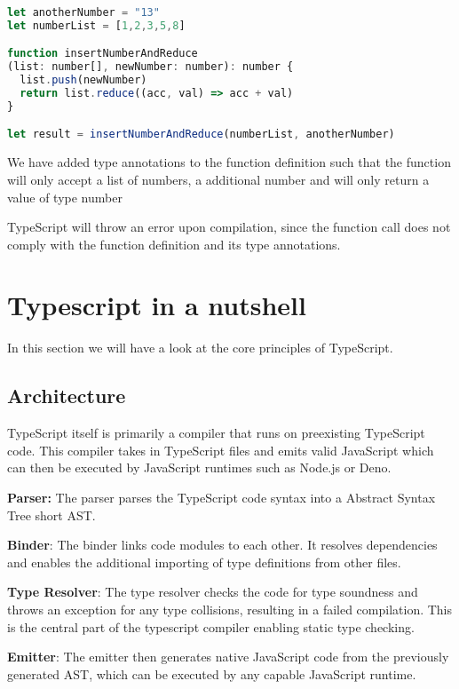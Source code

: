\documentclass[letterpaper,runningheads]{llncs}
\begin{document}
\begin{lstlisting}[style=ES6, language=JavaScript, caption="Fixed TypeScript code snippet"]
let anotherNumber = "13"
let numberList = [1,2,3,5,8]

function insertNumberAndReduce
(list: number[], newNumber: number): number {
  list.push(newNumber)
  return list.reduce((acc, val) => acc + val)
}

let result = insertNumberAndReduce(numberList, anotherNumber)
\end{lstlisting}

\begin{note}
We have added type annotations to the function definition such that
the function will only accept a list of numbers, a additional number
and will only return a value of type number
\end{note}

\begin{problem}
TypeScript will throw an error upon compilation, since the function
call does not comply with the function definition and its
type annotations. 
\end{problem}


\section{Typescript in a nutshell}

In this section we will have a look at the core principles of TypeScript.

\subsection{Architecture}

TypeScript itself is primarily a compiler that runs on preexisting TypeScript code. This compiler takes in TypeScript files and emits valid JavaScript which can then be executed by JavaScript runtimes such as Node.js or Deno.


\begin{list}{•}{The four building blocks of the TypeScript compiler:}

\item \textbf{Parser:} The parser parses the TypeScript code syntax into a Abstract Syntax Tree short AST.
\item \textbf{Binder}: The binder links code modules to each other. It resolves dependencies and enables the additional importing of type definitions from other files. 
\item \textbf{Type Resolver}: The type resolver checks the code for type soundness and throws an exception for any type collisions, resulting in a failed compilation. This is the central part of the typescript compiler enabling static type checking.
\item \textbf{Emitter}: The emitter then generates native JavaScript code from the previously generated AST, which can be executed by any capable JavaScript runtime.
\end{list}
\end{document}
